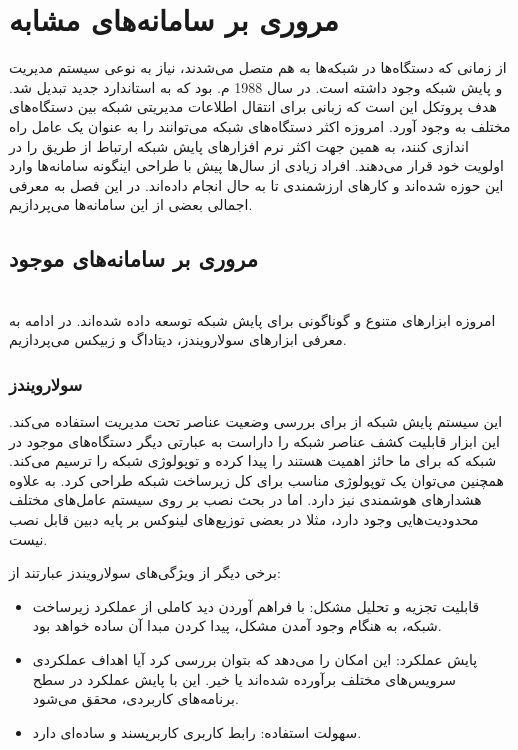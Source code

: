 \chapter{مروری بر سامانه‌های مشابه}

از زمانی که دستگاه‌ها در شبکه‌ها به هم متصل می‌شدند، نیاز به نوعی سیستم مدیریت و پایش شبکه وجود داشته است. در سال 1988 م. بود که  به استاندارد جدید تبدیل شد. هدف پروتکل  این است که زبانی برای انتقال اطلاعات مدیریتی شبکه بین دستگاه‌های مختلف به وجود آورد. امروزه اکثر دستگاه‌های شبکه می‌توانند  را به عنوان یک عامل راه اندازی کنند، به همین جهت اکثر نرم افزارهای پایش شبکه ارتباط از طریق  را در اولویت خود قرار می‌دهند.
افراد زیادی از سال‌ها پیش با طراحی اینگونه سامانه‌ها وارد این حوزه شده‌اند و کارهای ارزشمندی تا به حال انجام داده‌اند. در این فصل به معرفی اجمالی بعضی از این سامانه‌ها می‌پردازیم.

\section{مروری بر سامانه‌های موجود}
\\
امروزه ابزارهای متنوع و گوناگونی برای پایش شبکه توسعه داده شده‌اند. در ادامه به معرفی ابزارهای سولارویندز، دیتاداگ و زبیکس می‌پردازیم.



\subsection{سولارویندز}

این سیستم پایش شبکه از  برای بررسی وضعیت عناصر تحت مدیریت استفاده می‌کند. این ابزار قابلیت کشف عناصر شبکه را داراست به عبارتی دیگر دستگاه‌های موجود در شبکه که برای ما حائز اهمیت هستند را پیدا کرده و توپولوژی شبکه را ترسیم می‌کند. همچنین می‌توان یک توپولوژی مناسب برای کل زیرساخت شبکه طراحی کرد. به علاوه هشدارهای هوشمندی نیز دارد. اما در بحث نصب بر روی سیستم‌ عامل‌های مختلف محدودیت‌هایی وجود دارد، مثلا در بعضی توزیع‌های لینوکس بر پایه دبین قابل نصب نیست.

\newpage


برخی دیگر از ویژگی‌های سولارویندز عبارتند از:

\begin{itemize}
    \item قابلیت تجزیه و تحلیل مشکل: با فراهم آوردن دید کاملی از عملکرد زیرساخت شبکه، به هنگام وجود آمدن مشکل، پیدا کردن مبدا آن ساده خواهد بود.
    \item پایش عملکرد: این امکان را می‌دهد که بتوان بررسی کرد آیا اهداف عملکردی سرویس‌های مختلف برآورده شده‌اند یا خیر. این با پایش عملکرد در سطح برنامه‌های کاربردی، محقق می‌شود.
    \item سهولت استفاده: رابط کاربری کاربرپسند و ساده‌ای دارد.
\end{itemize}




